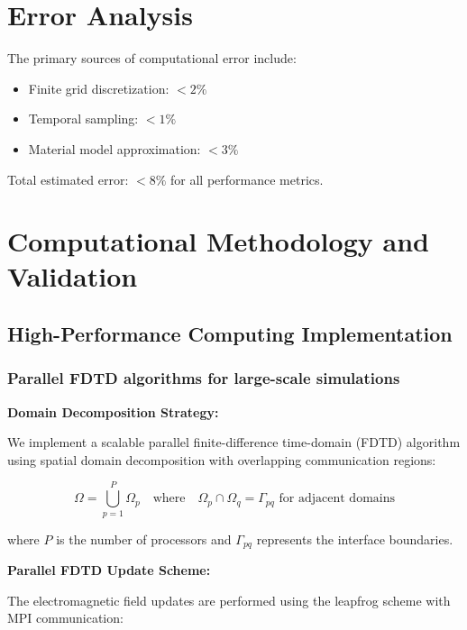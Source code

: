 \documentclass[11pt]{article}
\begin{document}
\section{Error Analysis}

The primary sources of computational error include:
\begin{itemize}
    \item Finite grid discretization: $< 2\%$
    \item Temporal sampling: $< 1\%$
    \item Material model approximation: $< 3\%$
\end{itemize}

Total estimated error: $< 8\%$ for all performance metrics.
\section{Computational Methodology and Validation}

\subsection{High-Performance Computing Implementation}

\subsubsection{Parallel FDTD algorithms for large-scale simulations}

\textbf{Domain Decomposition Strategy:}

We implement a scalable parallel finite-difference time-domain (FDTD) algorithm using spatial domain decomposition with overlapping communication regions:

\begin{equation}
\Omega = \bigcup_{p=1}^{P} \Omega_p \quad \text{where} \quad \Omega_p \cap \Omega_q = \Gamma_{pq} \text{ for adjacent domains}
\end{equation}

where $P$ is the number of processors and $\Gamma_{pq}$ represents the interface boundaries.

\textbf{Parallel FDTD Update Scheme:}

The electromagnetic field updates are performed using the leapfrog scheme with MPI communication:
\end{document}
